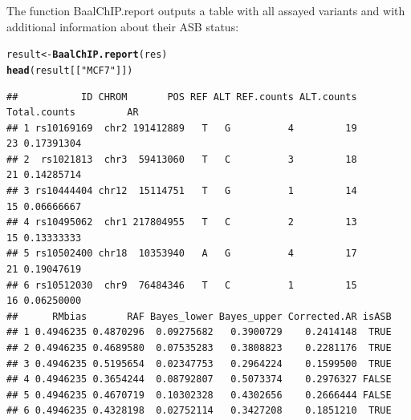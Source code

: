 \documentclass{article}\usepackage[]{graphicx}\usepackage[usenames,dvipsnames]{color}
\makeatletter
\newcommand{\hlstr}[1]{\textcolor[rgb]{0.192,0.494,0.8}{#1}}%
\newcommand{\hlstd}[1]{\textcolor[rgb]{0.345,0.345,0.345}{#1}}%
\newcommand{\hlkwb}[1]{\textcolor[rgb]{0.69,0.353,0.396}{#1}}%
\newcommand{\hlkwd}[1]{\textcolor[rgb]{0.737,0.353,0.396}{\textbf{#1}}}%
\newenvironment{kframe}{%
 \def\at@end@of@kframe{}%
 \ifinner\ifhmode%
  \def\at@end@of@kframe{\end{minipage}}%
  \begin{minipage}{\columnwidth}%
 \fi\fi%
 \def\FrameCommand##1{\hskip\@totalleftmargin \hskip-\fboxsep
 \colorbox{shadecolor}{##1}\hskip-\fboxsep
     \hskip-\linewidth \hskip-\@totalleftmargin \hskip\columnwidth}%
 \MakeFramed {\advance\hsize-\width
   \@totalleftmargin\z@ \linewidth\hsize
   \@setminipage}}%
 {\par\unskip\endMakeFramed%
 \at@end@of@kframe}
\newenvironment{knitrout}{}{} %
\makeatother
\begin{document}
The function BaalChIP.report outputs a table with all assayed variants and with additional information about their ASB status:

\begin{knitrout}
\color{fgcolor}\begin{kframe}
\begin{alltt}
\hlstd{result} \hlkwb{<-} \hlkwd{BaalChIP.report}\hlstd{(res)}
\hlkwd{head}\hlstd{(result[[}\hlstr{"MCF7"}\hlstd{]])}
\end{alltt}
\begin{verbatim}
##           ID CHROM       POS REF ALT REF.counts ALT.counts Total.counts         AR
## 1 rs10169169  chr2 191412889   T   G          4         19           23 0.17391304
## 2  rs1021813  chr3  59413060   T   C          3         18           21 0.14285714
## 3 rs10444404 chr12  15114751   T   G          1         14           15 0.06666667
## 4 rs10495062  chr1 217804955   T   C          2         13           15 0.13333333
## 5 rs10502400 chr18  10353940   A   G          4         17           21 0.19047619
## 6 rs10512030  chr9  76484346   T   C          1         15           16 0.06250000
##      RMbias       RAF Bayes_lower Bayes_upper Corrected.AR isASB
## 1 0.4946235 0.4870296  0.09275682   0.3900729    0.2414148  TRUE
## 2 0.4946235 0.4689580  0.07535283   0.3808823    0.2281176  TRUE
## 3 0.4946235 0.5195654  0.02347753   0.2964224    0.1599500  TRUE
## 4 0.4946235 0.3654244  0.08792807   0.5073374    0.2976327 FALSE
## 5 0.4946235 0.4670719  0.10302328   0.4302656    0.2666444 FALSE
## 6 0.4946235 0.4328198  0.02752114   0.3427208    0.1851210  TRUE
\end{verbatim}
\end{kframe}
\end{knitrout}



\end{document}
